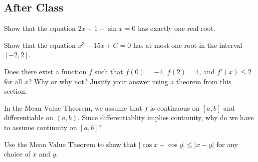 \documentclass[notes]{subfiles}
\begin{document}
	\subsection*{After Class}
		\begin{ex}
			Show that the equation $2x - 1 - \sin x = 0$ has exactly one real root.
		\end{ex}
			
		\begin{ex}
			Show that the equation $x^3 - 15x + C = 0$ has at most one root in the interval $[-2,2]$.
		\end{ex}
			\newpage
			
		\begin{ex}
			Does there exist a function $f$ such that $f(0) = -1$, $f(2) = 4$, and $f'(x)\leq 2$ for all $x$?  Why or why not?  Justify your answer using a theorem from this section.
		\end{ex}
			
		\begin{ex}
			In the Mean Value Theorem, we assume that $f$ is continuous on $[a,b]$ and differentiable on $(a,b)$.  Since differentiablity implies continuity, why do we have to assume continuity on $[a,b]$?
		\end{ex}
			
		\begin{ex}
			Use the Mean Value Theorem to show that $|\cos x - \cos y| \leq |x - y|$ for any choice of $x$ and $y$. 
		\end{ex}
	\clearpage
\end{document}
